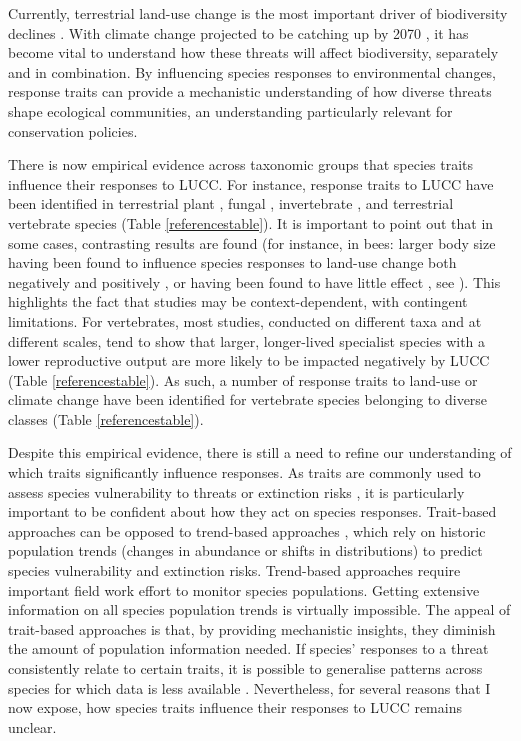 Currently, terrestrial land-use change is the most important driver of biodiversity declines \citep{Newbold2015, Chaudhary2016, Maxwell2016}.  With climate change projected to be catching up by 2070 \citep{Newbold2018}, it has become vital to understand how these threats will affect biodiversity, separately and in combination. By influencing species responses to environmental changes, response traits can provide a mechanistic understanding of how diverse threats shape ecological communities, an understanding particularly relevant for conservation policies. 

There is now empirical evidence across taxonomic groups that species traits influence their responses to LUCC. For instance, response traits to LUCC have been identified in terrestrial plant \citep{Diaz2001}, fungal \citep{Koide2013}, invertebrate \citep{Williams2010, Hall2019}, and terrestrial vertebrate species (Table \ref{referencestable}).
It is important to point out that in some cases, contrasting results are found (for instance, in bees: larger body size having been found to influence species responses to land-use change both negatively \citep{Larsen2005} and positively \citep{Depalma2015}, or having been found to have little effect \citep{Williams2010, Forrest2015}, see \citet{Bartomeus2018}). This highlights the fact that studies may be context-dependent, with contingent limitations. For vertebrates, most studies, conducted on different taxa and at different scales, tend to show that larger, longer-lived specialist species with a lower reproductive output are more likely to be impacted negatively by LUCC (Table \ref{referencestable}). As such, a number of response traits to land-use or climate change have been identified for vertebrate species belonging to diverse classes (Table \ref{referencestable}).

Despite this empirical evidence, there is still a need to refine our understanding of which traits significantly influence responses. As traits are commonly used to assess species vulnerability to threats or extinction risks \citep{Pacifici2015, Willis2015,Bohm2016b}, it is particularly important to be confident about how they act on species responses. Trait-based approaches can be opposed to trend-based approaches \citep{Pacifici2015}, which rely on historic population trends (changes in abundance or shifts in distributions) to predict species vulnerability and extinction risks. Trend-based approaches require important field work effort to monitor species populations. Getting extensive information on all species population trends is virtually impossible. The appeal of trait-based approaches is that, by providing mechanistic insights, they diminish the amount of population information needed. If species' responses to a threat consistently relate to certain traits, it is possible to generalise patterns across species for which data is less available \citep{Verberk2013}. Nevertheless, for several reasons that I now expose, how species traits influence their responses to LUCC remains unclear.

